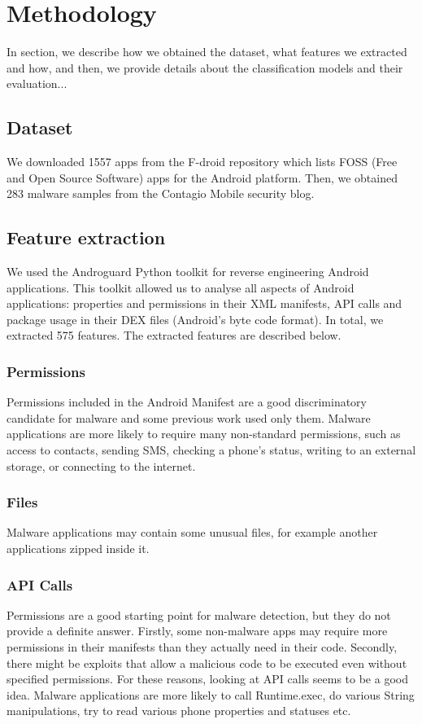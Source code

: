 \section{Methodology}
In section, we describe how we obtained the dataset, what features we extracted and how, and then, we provide details about the classification models and their evaluation...

\subsection{Dataset}
We downloaded 1557 apps from the F-droid \cite{fdroid} repository which lists FOSS (Free and Open Source Software) apps for the Android platform. Then, we obtained 283 malware samples from the Contagio Mobile \cite{contagio} security blog.

\subsection{Feature extraction}
We used the Androguard \cite{androguard} Python toolkit for reverse engineering Android applications. This toolkit allowed us to analyse all aspects of Android applications: properties and permissions in their XML manifests, API calls and package usage in their DEX files (Android's byte code format). In total, we extracted 575 features. The extracted features are described below.

\subsubsection{Permissions}
Permissions included in the Android Manifest are a good discriminatory candidate for malware and some previous work used only them. Malware applications are more likely to require many non-standard permissions, such as access to contacts, sending SMS, checking a phone's status, writing to an external storage, or connecting to the internet.

\subsubsection{Files}
Malware applications may contain some unusual files, for example another applications zipped inside it.

\subsubsection{API Calls}
Permissions are a good starting point for malware detection, but they do not provide a definite answer. Firstly, some non-malware apps may require more permissions in their manifests than they actually need in their code. Secondly, there might be exploits that allow a malicious code to be executed even without specified permissions. For these reasons, looking at API calls seems to be a good idea. Malware applications are more likely to call Runtime.exec, do various String manipulations, try to read various phone properties and statuses etc.

